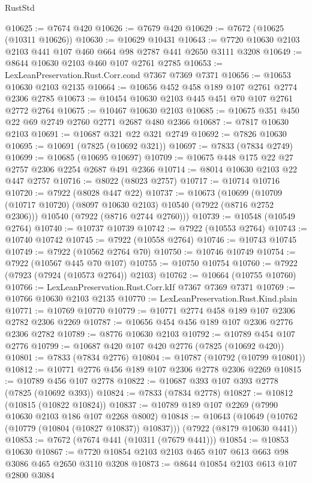 \begin{lexlean}{RustStd}
\begin{coremodule}
@10625 := @7674 @420
@10626 := @7679 @420
@10629 := @7672 (@10625 (@10311 @10626))
@10630 := @10629 @10431
@10643 := @7720 @10630 @2103 @2103 @441 @107 @460 @664 @98 @2787 @441 @2650 @3111 @3208
@10649 := @8644 @10630 @2103 @460 @107 @2761 @2785
@10653 := LexLeanPreservation.Rust.Corr.cond @7367 @7369 @7371
@10656 := @10653 @10630 @2103 @2135
@10664 := @10656 @452 @458 @189 @107 @2761 @2774 @2306 @2785
@10673 := @10454 @10630 @2103 @445 @451 @70 @107 @2761 @2772 @2764
@10675 := @10467 @10630 @2103
@10685 := @10675 @351 @450 @22 @69 @2749 @2760 @2771 @2687 @480 @2366
@10687 := @7817 @10630 @2103
@10691 := @10687 @321 @22 @321 @2749
@10692 := @7826 @10630
@10695 := @10691 (@7825 (@10692 @321))
@10697 := @7833 (@7834 @2749)
@10699 := @10685 (@10695 @10697)
@10709 := @10675 @448 @175 @22 @27 @2757 @2306 @2254 @2687 @491 @2366
@10714 := @8014 @10630 @2103 @22 @447 @2757
@10716 := @8022 (@8023 @2757)
@10717 := @10714 @10716
@10720 := @7922 (@8028 @447 @22)
@10737 := @10673
    (@10699
      (@10709 (@10717 @10720) (@8097 @10630 @2103) @10540 (@7922 (@8716 @2752 @2306)))
      @10540
      (@7922 (@8716 @2744 @2760)))
@10739 := @10548 (@10549 @2764)
@10740 := @10737 @10739
@10742 := @7922 (@10553 @2764)
@10743 := @10740 @10742
@10745 := @7922 (@10558 @2764)
@10746 := @10743 @10745
@10749 := @7922 (@10562 @2764 @70)
@10750 := @10746 @10749
@10754 := @7922 (@10567 @445 @70 @107)
@10755 := @10750 @10754
@10760 := @7922 (@7923 (@7924 (@10573 @2764)) @2103)
@10762 := @10664 (@10755 @10760)
@10766 := LexLeanPreservation.Rust.Corr.kIf @7367 @7369 @7371
@10769 := @10766 @10630 @2103 @2135
@10770 := LexLeanPreservation.Rust.Kind.plain
@10771 := @10769 @10770
@10779 := @10771 @2774 @458 @189 @107 @2306 @2782 @2306 @2269
@10787 := @10656 @454 @456 @189 @107 @2306 @2776 @2306 @2782
@10789 := @8776 @10630 @2103
@10792 := @10789 @454 @107 @2776
@10799 := @10687 @420 @107 @420 @2776 (@7825 (@10692 @420))
@10801 := @7833 (@7834 @2776)
@10804 := @10787 (@10792 (@10799 @10801))
@10812 := @10771 @2776 @456 @189 @107 @2306 @2778 @2306 @2269
@10815 := @10789 @456 @107 @2778
@10822 := @10687 @393 @107 @393 @2778 (@7825 (@10692 @393))
@10824 := @7833 (@7834 @2778)
@10827 := @10812 (@10815 (@10822 @10824))
@10837 := @10789 @189 @107 @2269 (@7990 @10630 @2103 @186 @107 @2268 @8002)
@10848 := @10643
    (@10649 (@10762 (@10779 (@10804 (@10827 @10837)) @10837)))
    (@7922 (@8179 @10630 @441))
@10853 := @7672 (@7674 @441 (@10311 (@7679 @441)))
@10854 := @10853 @10630
@10867 := @7720 @10854 @2103 @2103 @465 @107 @613 @663 @98 @3086 @465 @2650 @3110 @3208
@10873 := @8644 @10854 @2103 @613 @107 @2800 @3084

\end{coremodule}
\end{lexlean}
